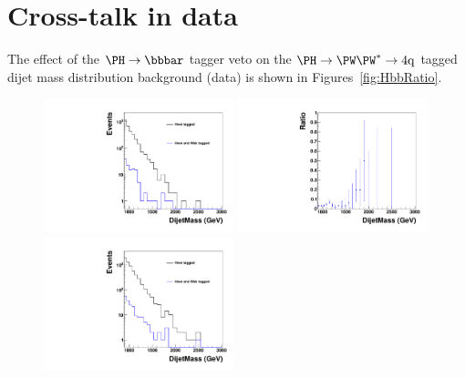 \newpage
\section{Cross-talk in data}
\label{appendix:crosstalkData}

The effect of the $\Hbb$ tagger veto on the $\Hww$ tagged dijet
mass distribution
background (data) is shown in Figures~\ref{fig:HbbRatio}.


\begin{figure}[ht]
\begin{center}
\includegraphics[width=0.49\textwidth, height=0.45\textwidth]{HqqqqZqqfigs/HbbHww/HighPurity.pdf}
\includegraphics[width=0.49\textwidth, height=0.45\textwidth]{HqqqqZqqfigs/HbbHww/HighPurityRatio.pdf}
\includegraphics[width=0.49\textwidth, height=0.45\textwidth]{HqqqqZqqfigs/HbbHww/LowHPurity.pdf}

\end{center}
\end{figure}
